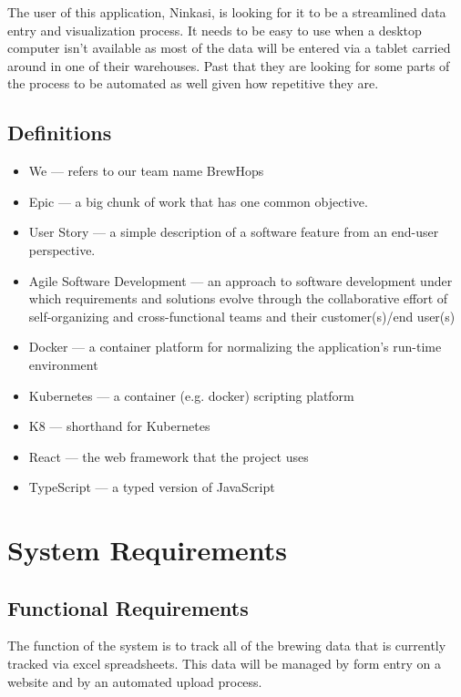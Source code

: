         The user of this application, Ninkasi, is looking for it to be a streamlined data entry and visualization process.  It needs to be easy to use when a desktop computer isn't available as most of the data will be entered via a tablet carried around in one of their warehouses.  Past that they are looking for some parts of the process to be automated as well given how repetitive they are.

    \subsection{Definitions}
    \begin{itemize}
        \item We --- refers to our team name BrewHops
        \item Epic --- a big chunk of work that has one common objective.
        \item User Story --- a simple description of a software feature from an end-user perspective.
        \item Agile Software Development --- an approach to software development under which requirements and solutions evolve through the collaborative effort of self-organizing and cross-functional teams and their customer(s)/end user(s)
        \item Docker --- a container platform for normalizing the application's run-time environment \cite{docker}
        \item Kubernetes --- a container (e.g. docker) scripting platform \cite{kubernetes}
        \item K8 --- shorthand for Kubernetes
        \item React --- the web framework that the project uses \cite{react}
        \item TypeScript --- a typed version of JavaScript \cite{typescript}
    \end{itemize}

\section{System Requirements}
    \subsection{Functional Requirements}
    The function of the system is to track all of the brewing data that is currently tracked via excel spreadsheets. This data will be managed by form entry on a website and by an automated upload process.
